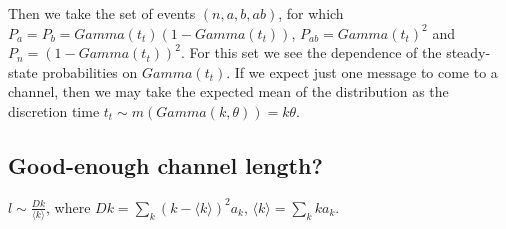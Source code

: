 \begin{itemize}
Then we take the set of events $(n,a,b,ab)$, for which $P_{a} = P_{b} = Gamma(t_{t})(1 - Gamma(t_{t}))$, $P_{ab} = Gamma(t_{t})^2$ and $P_{n} = (1 - Gamma(t_{t}))^2$. For this set we see the dependence of the steady-state probabilities on $Gamma(t_{t})$. If we expect just one message to come to a channel, then we may take the expected mean of the distribution as the discretion time $t_{t} \sim m(Gamma(k,\theta)) = k \theta$.
      \end{itemize}

  \subsection{Good-enough channel length?}
$l \sim \frac{Dk}{\langle k \rangle}$, where $Dk = \sum_{k} (k - \langle k \rangle)^{2} a_{k}$, $\langle k \rangle = \sum_{k} k a_{k}$.
